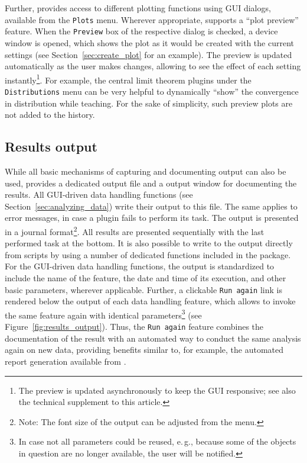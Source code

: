 Further,  provides access to different plotting functions using GUI dialogs,
available from the \texttt{Plots} menu. Wherever appropriate,  supports a ``plot
preview'' feature. When the \texttt{Preview} box of
the respective dialog is checked, a device window is opened, which
shows the plot as it would be created with the current settings (see Section~\ref{sec:create_plot} for an example). The
preview is updated automatically as the user makes changes, allowing to
see the effect of each setting instantly\footnote{The preview is
updated asynchronously to keep the GUI responsive; see also the technical supplement to this article.}. For example, the
central limit theorem plugins
under the \texttt{Distributions} menu can be very helpful to dynamically ``show''
the convergence in distribution while teaching. For the sake of simplicity, such preview plots are not added to
the history.

\subsection{Results output}
\label{sec:results_output}

While all basic mechanisms of
capturing and documenting  output can also
be used,  provides a dedicated output file and a output
window for documenting the results. All GUI-driven data handling
functions (see Section~\ref{sec:analyzing_data}) write their output to this file. 
The same applies to error messages, in case a plugin fails to perform its task.
The output is presented in a journal format\footnote{Note: The font size of the output can be adjusted
from the menu. 
}. All results are presented
sequentially with the last performed task at the bottom.
It is also possible to write to the output directly from 
scripts by using a number of dedicated 
functions included in the  package. For the GUI-driven data handling functions, the output is
standardized to include the name of the feature, the date and time of
its execution, and other basic parameters, wherever
applicable. Further, a clickable \texttt{Run
again} link is rendered below the output of each data
handling feature, which allows to invoke the same feature again with
identical parameters\footnote{In case not all parameters could be
reused, e.\,g., because some of the objects in
question are no longer available, the user will be notified.} (see
Figure~\ref{fig:results_output}). Thus, the \texttt{Run
again} feature combines the documentation of the result
with an automated way to conduct the same analysis again on new
data, providing benefits similar to, for example, the automated report generation
available from  \citep{RaffelsbergerW2008}.

